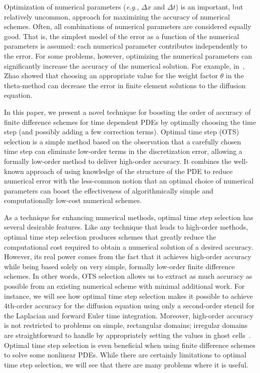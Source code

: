 \documentclass[fleqn,12pt,twoside]{article}
\def\dt{\Delta t}
\def\dx{\Delta x}
\def\eg{\emph{e.g., }}
\begin{document}
Optimization of numerical parameters (\eg $\dx$ and $\dt$) is an important, 
but relatively uncommon, approach for maximizing the accuracy of numerical 
schemes.  Often, all combinations of numerical parameters are considered 
equally good.  That is, the simplest model of the error as a function 
of the numerical parameters is assumed:  each numerical parameter contributes
independently to the error.  For some problems, however, optimizing the 
numerical parameters can significantly increase the accuracy of the 
numerical solution.  For example, in~\cite{zhao_2006}, Zhao showed that 
choosing an appropriate value for the weight factor $\theta$ in the 
theta-method can decrease the error in finite element solutions to the 
diffusion equation. 

In this paper, we present a novel technique for boosting the order of 
accuracy of finite difference schemes for time dependent PDEs by optimally 
choosing the time step (and possibly adding a few correction terms).  
Optimal time step (OTS) selection is a simple method based on the observation 
that a carefully chosen time step can eliminate low-order terms in the 
discretization error, allowing a formally low-order method to deliver 
high-order accuracy.  It combines the well-known approach of using knowledge 
of the structure of the PDE to reduce numerical error with the less-common 
notion that an optimal choice of numerical parameters can boost the 
effectiveness of algorithmically simple and computationally low-cost numerical 
schemes.  

As a technique for enhancing numerical methods, optimal time step selection 
has several desirable features.  Like any technique that leads to high-order 
methods, optimal time step selection produces schemes that greatly reduce the 
computational cost required to obtain a numerical solution of a desired 
accuracy.  However, its real power comes from the fact that it achieves
high-order accuracy while being based solely on very simple, formally 
low-order finite difference schemes.  In other words, OTS selection allows us
to extract as much accuracy as possible from an existing numerical scheme
with minimal additional work.  For instance, we will see how optimal time step 
selection makes it possible to achieve 4th-order accuracy for the diffusion 
equation using only a second-order stencil for the Laplacian and forward 
Euler time integration.  Moreover, high-order accuracy is not restricted to 
problems on simple, rectangular domains; irregular domains are straightforward 
to handle by appropriately setting the values in ghost 
cells~\cite{gibou_2005,ito_2005,fedkiw_1999,osher_fedkiw_book}.  
Optimal time step selection is even beneficial when 
using finite difference schemes to solve some nonlinear PDEs.  While there 
are certainly limitations to optimal time step selection, we will see that 
there are many problems where it is useful.  
\end{document}
